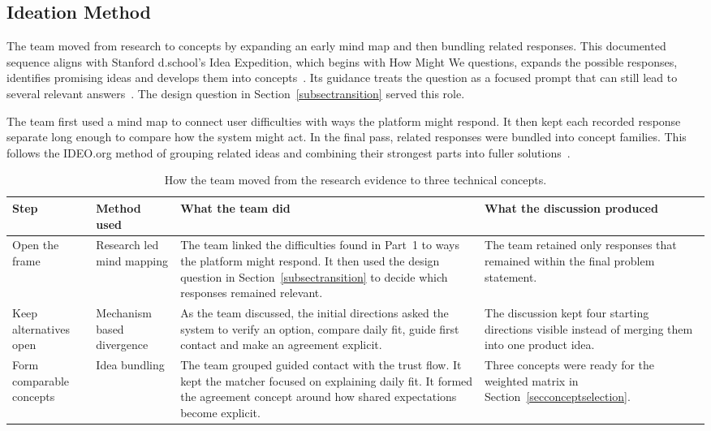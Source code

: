 \documentclass[11pt,a4paper]{article}
\begin{document}
\subsection{Ideation Method}
\label{subsecideationmethod}

The team moved from research to concepts by expanding an early mind map and then bundling related responses. This documented sequence aligns with Stanford d.school's Idea Expedition, which begins with How Might We questions, expands the possible responses, identifies promising ideas and develops them into concepts~\cite{refideaexpedition}. Its guidance treats the question as a focused prompt that can still lead to several relevant answers~\cite{refhmw}. The design question in Section~\ref{subsectransition} served this role.

The team first used a mind map to connect user difficulties with ways the platform might respond. It then kept each recorded response separate long enough to compare how the system might act. In the final pass, related responses were bundled into concept families. This follows the IDEO.org method of grouping related ideas and combining their strongest parts into fuller solutions~\cite{refbundleideas}.

\begin{table}[H]
    \centering
    \small
    \caption{How the team moved from the research evidence to three technical concepts.}
    \begin{tabularx}{\textwidth}{@{}L{2.2cm}L{2.8cm}Y Y@{}}
        \toprule
        Step & Method used & What the team did & What the discussion produced\\
        \midrule
        Open the frame & Research led mind mapping & The team linked the difficulties found in Part~1 to ways the platform might respond. It then used the design question in Section~\ref{subsectransition} to decide which responses remained relevant. & The team retained only responses that remained within the final problem statement.\\
        Keep alternatives open & Mechanism based divergence & As the team discussed, the initial directions asked the system to verify an option, compare daily fit, guide first contact and make an agreement explicit. & The discussion kept four starting directions visible instead of merging them into one product idea.\\
        Form comparable concepts & Idea bundling & The team grouped guided contact with the trust flow. It kept the matcher focused on explaining daily fit. It formed the agreement concept around how shared expectations become explicit. & Three concepts were ready for the weighted matrix in Section~\ref{secconceptselection}.\\
        \bottomrule
    \end{tabularx}
    \label{tabideationmethod}
\end{table}
\end{document}
